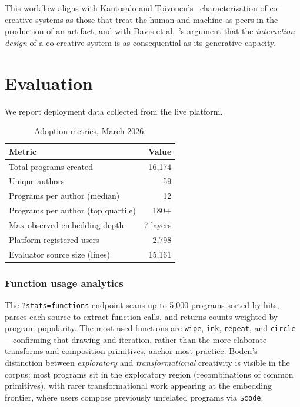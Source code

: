 \documentclass[letterpaper]{article}
\begin{document}
This workflow aligns with Kantosalo and Toivonen's~ characterization of co-creative systems as those that treat the human and machine as peers in the production of an artifact, and with Davis et al.~'s argument that the \emph{interaction design} of a co-creative system is as consequential as its generative capacity.

\section{Evaluation}

We report deployment data collected from the live platform.

\begin{table}[h]
\small
\centering
\begin{tabular}{lr}
\toprule
\textbf{Metric} & \textbf{Value} \\
\midrule
Total programs created            & 16{,}174 \\
Unique authors                    & 59 \\
Programs per author (median)      & 12 \\
Programs per author (top quartile)& 180+ \\
Max observed embedding depth      & 7 layers \\
Platform registered users         & 2{,}798 \\
Evaluator source size (lines)     & 15{,}161 \\
\bottomrule
\end{tabular}
\caption{Adoption metrics, March 2026.}
\label{tab:adoption}
\end{table}

\subsubsection{Function usage analytics} The \texttt{?stats=functions} endpoint scans up to 5{,}000 programs sorted by hits, parses each source to extract function calls, and returns counts weighted by program popularity. The most-used functions are \texttt{wipe}, \texttt{ink}, \texttt{repeat}, and \texttt{circle}---confirming that drawing and iteration, rather than the more elaborate transforms and composition primitives, anchor most practice. Boden's~ distinction between \emph{exploratory} and \emph{transformational} creativity is visible in the corpus: most programs sit in the exploratory region (recombinations of common primitives), with rarer transformational work appearing at the embedding frontier, where users compose previously unrelated programs via \texttt{\$code}.
\end{document}
